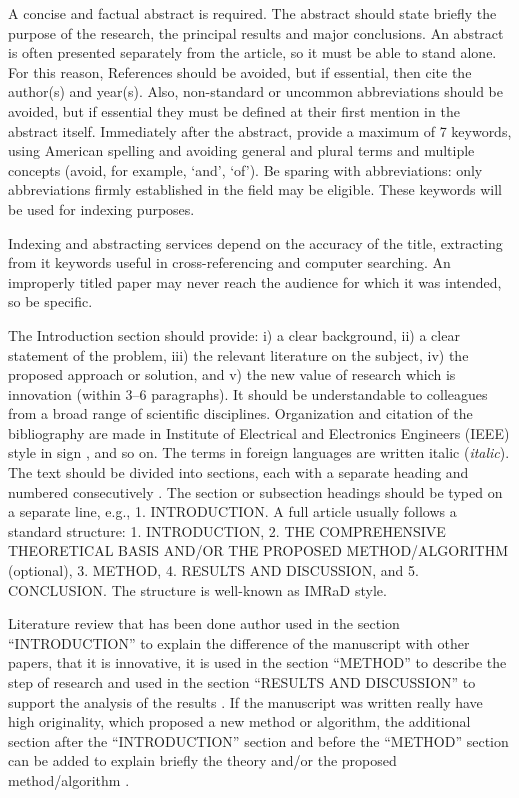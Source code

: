 \documentclass[10pt,a4paper]{article}
\begin{document}
A concise and factual abstract is required. The abstract should state briefly the purpose of the research, the principal results and major conclusions. An abstract is often presented separately from the article, so it must be able to stand alone. For this reason, References should be avoided, but if essential, then cite the author(s) and year(s). Also, non-standard or uncommon abbreviations should be avoided, but if essential they must be defined at their first mention in the abstract itself. Immediately after the abstract, provide a maximum of 7 keywords, using American spelling and avoiding general and plural terms and multiple concepts (avoid, for example, `and', `of'). Be sparing with abbreviations: only abbreviations firmly established in the field may be eligible. These keywords will be used for indexing purposes.

Indexing and abstracting services depend on the accuracy of the title, extracting from it keywords useful in cross-referencing and computer searching. An improperly titled paper may never reach the audience for which it was intended, so be specific.

The Introduction section should provide: i) a clear background, ii) a clear statement of the problem, iii) the relevant literature on the subject, iv) the proposed approach or solution, and v) the new value of research which is innovation (within 3--6 paragraphs). It should be understandable to colleagues from a broad range of scientific disciplines. Organization and citation of the bibliography are made in Institute of Electrical and Electronics Engineers (IEEE) style in sign \cite{sigala2019big}, \cite{nguyen2019machine} and so on. The terms in foreign languages are written italic (\textit{italic}). The text should be divided into sections, each with a separate heading and numbered consecutively \cite{shorten2019survey}. The section or subsection headings should be typed on a separate line, e.g., 1. INTRODUCTION. A full article usually follows a standard structure: 1. INTRODUCTION, 2. THE COMPREHENSIVE THEORETICAL BASIS AND/OR THE PROPOSED METHOD/ALGORITHM (optional), 3. METHOD, 4. RESULTS AND DISCUSSION, and 5. CONCLUSION. The structure is well-known as IMRaD style.

Literature review that has been done author used in the section ``INTRODUCTION'' to explain the difference of the manuscript with other papers, that it is innovative, it is used in the section ``METHOD'' to describe the step of research and used in the section ``RESULTS AND DISCUSSION'' to support the analysis of the results \cite{nguyen2019machine}. If the manuscript was written really have high originality, which proposed a new method or algorithm, the additional section after the ``INTRODUCTION'' section and before the ``METHOD'' section can be added to explain briefly the theory and/or the proposed method/algorithm \cite{vinayakumar2019deep}.
\end{document}
